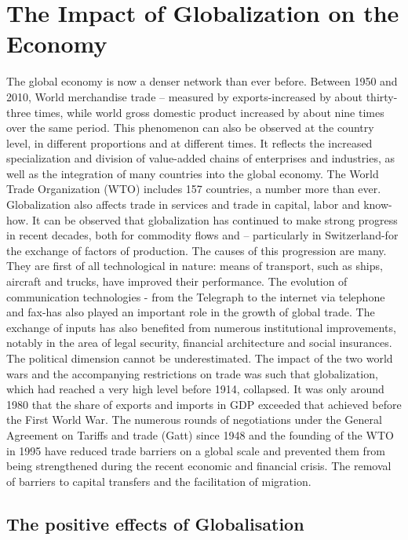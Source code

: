 \documentclass[12pt]{article}
\begin{document}
\section{The Impact of Globalization on the Economy}
The global economy is now a denser network than ever before. Between 1950 and 2010, World merchandise trade – measured by exports-increased by about thirty-three times, while world gross domestic product increased by about nine times over the same period. This phenomenon can also be observed at the country level, in different proportions and at different times. It reflects the increased specialization and division of value-added chains of enterprises and industries, as well as the integration of many countries into the global economy. The World Trade Organization (WTO) includes 157 countries, a number more than ever. Globalization also affects trade in services and trade in capital, labor and know-how. It can be observed that globalization has continued to make strong progress in recent decades, both for commodity flows and – particularly in Switzerland-for the exchange of factors of production. The causes of this progression are many. They are first of all technological in nature: means of transport, such as ships, aircraft and trucks, have improved their performance. The evolution of communication technologies - from the Telegraph to the internet via telephone and fax-has also played an important role in the growth of global trade. The exchange of inputs has also benefited from numerous institutional improvements, notably in the area of legal security, financial architecture and social insurances. The political dimension cannot be underestimated. The impact of the two world wars and the accompanying restrictions on trade was such that globalization, which had reached a very high level before 1914, collapsed. It was only around 1980 that the share of exports and imports in GDP exceeded that achieved before the First World War. The numerous rounds of negotiations under the General Agreement on Tariffs and trade (Gatt) since 1948 and the founding of the WTO in 1995 have reduced trade barriers on a global scale and prevented them from being strengthened during the recent economic and financial crisis. The removal of barriers to capital transfers and the facilitation of migration.

\subsection{The positive effects of Globalisation}
\end{document}
